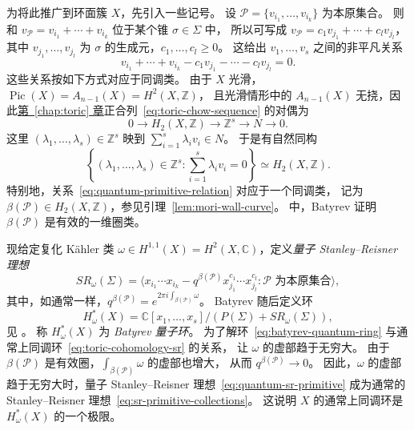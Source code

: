 \begin{example}
为将此推广到环面簇 $X$，先引入一些记号。
设 $\mathcal P=\{v_{i_1},\ldots,v_{i_k}\}$ 为本原集合。
则和 $v_{\mathcal P}=v_{i_1}+\cdots+v_{i_k}$ 位于某个锥 $\sigma\in\Sigma$ 中，
所以可写成 $v_{\mathcal P}=c_1v_{j_1}+\cdots+c_lv_{j_l}$，
其中 $v_{j_1},\ldots,v_{j_l}$ 为 $\sigma$ 的生成元，$c_1,\ldots,c_l\geq0$。
这给出 $v_1,\ldots,v_s$ 之间的非平凡关系
\begin{equation}\label{eq:quantum-primitive-relation}
v_{i_1}+\cdots+v_{i_k}-c_1v_{j_1}-\cdots-c_lv_{j_l}=0.
\end{equation}
这些关系按如下方式对应于同调类。
由于 $X$ 光滑，$\operatorname{Pic}(X)=A_{n-1}(X)=H^2(X,\mathbb Z)$，
且光滑情形中的 $A_{n-1}(X)$ 无挠，因此\hyperref[chap:toric]{第~\ref*{chap:toric} 章}正合列~\eqref{eq:toric-chow-sequence} 的对偶为
\[
0\longrightarrow H_2(X,\mathbb Z)\longrightarrow\mathbb Z^s\longrightarrow N\longrightarrow0.
\]
这里 $(\lambda_1,\ldots,\lambda_s)\in\mathbb Z^s$ 映到 $\sum_{i=1}^s\lambda_iv_i\in N$。
于是有自然同构
\begin{equation}\label{eq:toric-relation-homology}
\left\{(\lambda_1,\ldots,\lambda_s)\in\mathbb Z^s:\sum_{i=1}^s\lambda_iv_i=0\right\}
\simeq H_2(X,\mathbb Z).
\end{equation}
特别地，关系~\eqref{eq:quantum-primitive-relation} 对应于一个同调类，
记为 $\beta(\mathcal P)\in H_2(X,\mathbb Z)$，参见引理~\ref{lem:mori-wall-curve}。
 中，Batyrev 证明 $\beta(\mathcal P)$ 是有效的一维圈类。

现给定复化 Kähler 类 $\omega\in H^{1,1}(X)=H^2(X,\mathbb C)$，定义\emph{量子 Stanley--Reisner 理想}
\begin{equation}\label{eq:quantum-sr-primitive}
SR_\omega(\Sigma)=\langle x_{i_1}\cdots x_{i_k}
-q^{\beta(\mathcal P)}x_{j_1}^{c_1}\cdots x_{j_l}^{c_l}:\mathcal P\text{ 为本原集合}\rangle,
\end{equation}
其中，如通常一样，$q^{\beta(\mathcal P)}=e^{2\pi i\int_{\beta(\mathcal P)}\omega}$。
Batyrev 随后定义环
\begin{equation}\label{eq:batyrev-quantum-ring}
H_\omega^*(X)=\mathbb C[x_1,\ldots,x_s]/(P(\Sigma)+SR_\omega(\Sigma)),
\end{equation}
见 。
称 $H_\omega^*(X)$ 为 \emph{Batyrev 量子环}。
为了解环~\eqref{eq:batyrev-quantum-ring} 与通常上同调环~\eqref{eq:toric-cohomology-sr} 的关系，
让 $\omega$ 的虚部趋于无穷大。
由于 $\beta(\mathcal P)$ 是有效圈，$\int_{\beta(\mathcal P)}\omega$ 的虚部也增大，
从而 $q^{\beta(\mathcal P)}\to0$。
因此，$\omega$ 的虚部趋于无穷大时，量子 Stanley--Reisner 理想~\eqref{eq:quantum-sr-primitive}
成为通常的 Stanley--Reisner 理想~\eqref{eq:sr-primitive-collections}。
这说明 $X$ 的通常上同调环是 $H_\omega^*(X)$ 的一个极限。


\end{example}
